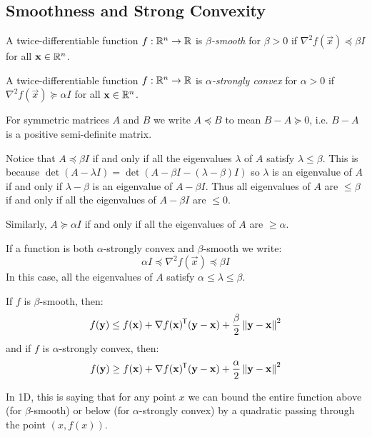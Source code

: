 \documentclass[../main.tex]{subfiles}
\begin{document}
\subsection{Smoothness and Strong Convexity}
\begin{definition}
  A twice-differentiable function $f: \mathbb{R}^{n} \to \mathbb{R}$ is \textit{$\beta$-smooth} for $\beta > 0$ if $\nabla^2 f(\vec{x}) \preceq \beta I$ for all $\mathbf{\bm{x}} \in \mathbb{R}^{n}$.
\end{definition}
\begin{definition}
  A twice-differentiable function $f: \mathbb{R}^{n} \to \mathbb{R}$ is \textit{$\alpha$-strongly convex} for $\alpha > 0$ if $\nabla^2 f(\vec{x}) \succeq \alpha I$ for all $\mathbf{\bm{x}} \in \mathbb{R}^{n}$.
\end{definition}
\begin{remark}[Notation]
  For symmetric matrices $A$ and $B$ we write $A \preceq B$ to mean $B - A \succeq 0$, i.e. $B - A$ is a positive semi-definite matrix.
\end{remark}
\begin{remark}
  Notice that $A \preceq \beta I$ if and only if all the eigenvalues $\lambda$ of $A$ satisfy $\lambda \leq \beta$.
  This is because $\det(A - \lambda I) = \det (A - \beta I - (\lambda - \beta)I)$ so $\lambda$ is an eigenvalue of $A$ if and only if $\lambda - \beta$ is an eigenvalue of $A - \beta I$. Thus all eigenvalues of $A$ are $\leq \beta$ if and only if all the eigenvalues of $A - \beta I$ are $\leq 0$.

  Similarly, $A \succeq \alpha I$ if and only if all the eigenvalues of $A$ are $\geq \alpha$.
\end{remark}
If a function is both $\alpha$-strongly convex and $\beta$-smooth we write:
\[
  \alpha I \preceq \nabla^2 f(\vec{x}) \preceq \beta I
\]
In this case, all the eigenvalues of $A$ satisfy $\alpha \leq \lambda \leq \beta$.
\begin{theorem}
  If $f$ is $\beta$-smooth, then:
  \[
    f(\mathbf{\bm{y}}) \leq f(\mathbf{\bm{x}}) + \nabla f(\mathbf{\bm{x}})^{{\mkern-1.5mu\mathsf{T}}}(\mathbf{\bm{y}} - \mathbf{\bm{x}}) + \frac{\beta}{2}\left\lVert \mathbf{\bm{y}} - \mathbf{\bm{x}} \right\rVert^2
  \]
  and if $f$ is $\alpha$-strongly convex, then:
  \[
    f(\mathbf{\bm{y}}) \geq f(\mathbf{\bm{x}}) + \nabla f(\mathbf{\bm{x}})^{{\mkern-1.5mu\mathsf{T}}} (\mathbf{\bm{y}} - \mathbf{\bm{x}}) + \frac{\alpha}{2}\left\lVert \mathbf{\bm{y}} - \mathbf{\bm{x}} \right\rVert^2
  \]
\end{theorem}
\begin{remark}[Intuitition]
  In 1D, this is saying that for any point $x$ we can bound the entire function above (for $\beta$-smooth) or below (for $\alpha$-strongly convex) by a quadratic passing through the point $(x, f(x))$.
\end{remark}
\end{document}
